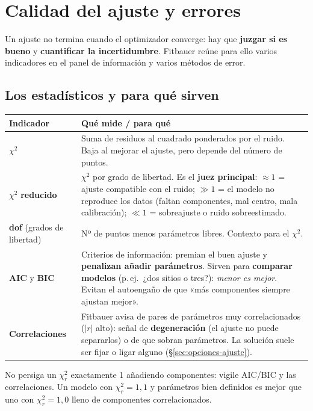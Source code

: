 \section{Calidad del ajuste y errores}
\label{sec:calidad}

Un ajuste no termina cuando el optimizador converge: hay que \textbf{juzgar si es
bueno} y \textbf{cuantificar la incertidumbre}. Fitbauer reúne para ello varios
indicadores en el panel de información y varios métodos de error.

\subsection{Los estadísticos y para qué sirven}

\begin{center}
\begin{tabular}{@{}lp{}@{}}
\toprule
\textbf{Indicador} & \textbf{Qué mide / para qué} \\
\midrule
$\chi^2$ & Suma de residuos al cuadrado ponderados por el ruido. Baja al mejorar
el ajuste, pero depende del número de puntos. \\[3pt]
$\chi^2$ \textbf{reducido} & $\chi^2$ por grado de libertad. Es el \textbf{juez
principal}: $\approx 1$ = ajuste compatible con el ruido; $\gg 1$ = el modelo no
reproduce los datos (faltan componentes, mal centro, mala calibración);
$\ll 1$ = sobreajuste o ruido sobreestimado. \\[3pt]
\textbf{dof} (grados de libertad) & Nº de puntos menos parámetros libres. Contexto
para el $\chi^2$. \\[3pt]
\textbf{AIC} y \textbf{BIC} & Criterios de información: premian el buen ajuste y
\textbf{penalizan añadir parámetros}. Sirven para \textbf{comparar modelos}
(p.\,ej.\ ¿dos sitios o tres?): \emph{menor es mejor}. Evitan el autoengaño de que
«más componentes siempre ajustan mejor». \\[3pt]
\textbf{Correlaciones} & Fitbauer avisa de pares de parámetros muy correlacionados
($|r|$ alto): señal de \textbf{degeneración} (el ajuste no puede separarlos) o de
que sobran parámetros. La solución suele ser fijar o ligar alguno
(§\ref{sec:opciones-ajuste}). \\
\bottomrule
\end{tabular}
\end{center}

\begin{truco}
No persiga un $\chi^2_r$ exactamente 1 añadiendo componentes: vigile AIC/BIC y las
correlaciones. Un modelo con $\chi^2_r=1{,}1$ y parámetros bien definidos es mejor
que uno con $\chi^2_r=1{,}0$ lleno de componentes correlacionados.
\end{truco}

